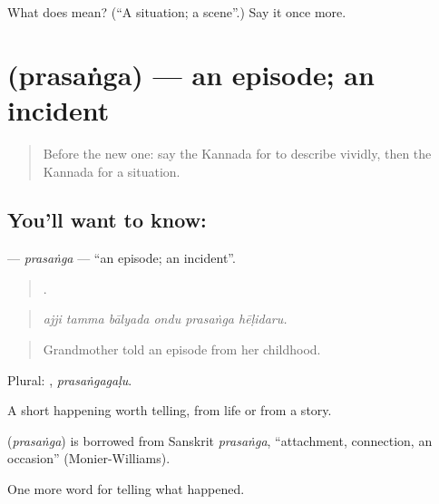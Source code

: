 \begin{tcolorbox}[breakable,colback=teal!4,colframe=teal!35!black,title={Before you move on}]
What does  mean? (\textquotedblleft{}A situation; a scene\textquotedblright{}.) Say it once more.
\end{tcolorbox}
\section[\texorpdfstring{\kn{ಪ್ರಸಂಗ} (prasaṅga)}{ಪ್ರಸಂಗ (prasaṅga)}]{ (prasaṅga) — an episode; an incident}

\label{lesson:KA-C343-prasanga}



\begin{quote}
Before the new one: say the Kannada for to describe vividly, then the Kannada for a situation.
\end{quote}

\subsection*{You'll want to know: }
\textbf{} — \emph{prasaṅga} — \textquotedblleft{}an episode; an incident\textquotedblright{}.

\begin{quote}
     .
\end{quote}

\begin{quote}
\emph{ajji tamma bālyada ondu prasaṅga hēḷidaru.}
\end{quote}

\begin{quote}
Grandmother told an episode from her childhood.
\end{quote}

Plural: , \emph{prasaṅgagaḷu}.

A short happening worth telling, from life or from a story.

\begin{cousinweb}
\textbf{} (\emph{prasaṅga}) is borrowed from Sanskrit \emph{prasaṅga}, \textquotedblleft{}attachment, connection, an occasion\textquotedblright{} (Monier-Williams).
\end{cousinweb}

\begin{grammarlens}[title={What you've built}]
One more word for telling what happened.
\end{grammarlens}

